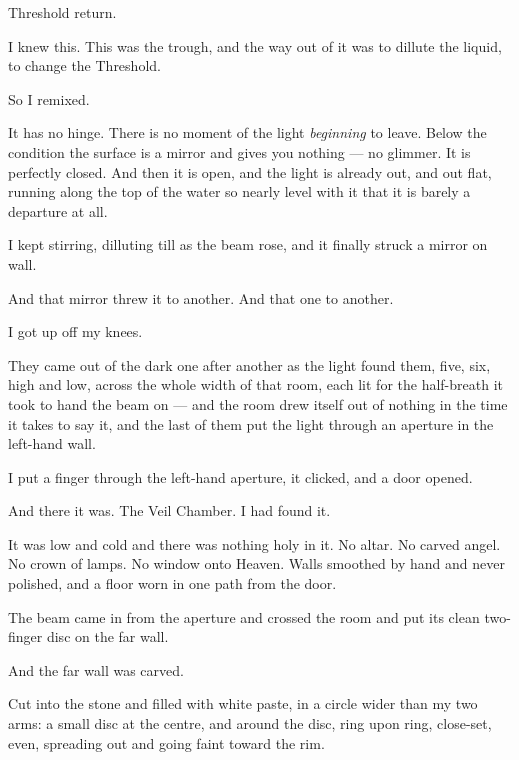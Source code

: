 Threshold return.\par

I knew this. This was the trough, and the way out of it was to dillute the liquid, to change the Threshold.\par

So I remixed.\par

It has no hinge. There is no moment of the light \textit{beginning} to leave. Below the condition the surface is a mirror and gives you nothing --- no glimmer. It is perfectly closed. And then it is open, and the light is already out, and out flat, running along the top of the water so nearly level with it that it is barely a departure at all.\par

I kept stirring, dilluting till as the beam rose, and it finally struck a mirror on wall.

And that mirror threw it to another. And that one to another.\par

I got up off my knees.\par

They came out of the dark one after another as the light found them, five, six, high and low, across the whole width of that room, each lit for the half-breath it took to hand the beam on --- and the room drew itself out of nothing in the time it takes to say it, and the last of them put the light through an aperture in the left-hand wall.\par

I put a finger through the left-hand aperture, it clicked, and a door opened.\par

\ornament

And there it was. The Veil Chamber. I had found it.

It was low and cold and there was nothing holy in it. No altar. No carved angel. No crown of lamps. No window onto Heaven. Walls smoothed by hand and never polished, and a floor worn in one path from the door.\par

The beam came in from the aperture and crossed the room and put its clean two-finger disc on the far wall.\par

And the far wall was carved.\par

Cut into the stone and filled with white paste, in a circle wider than my two arms: a small disc at the centre, and around the disc, ring upon ring, close-set, even, spreading out and going faint toward the rim.\par

